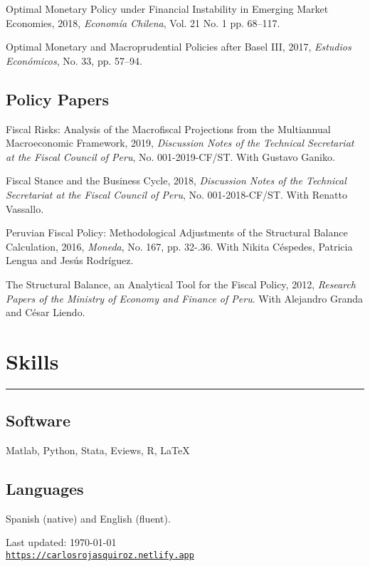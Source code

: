 \documentclass[letterpaper, Biolinum]{article}
\def\footerlink{https://carlosrojasquiroz.netlify.app}
\renewenvironment{itemize}{
  \begin{list}{}{
    \setlength{\leftmargin}{1.5em}
  }
}{
  \end{list}
}
\begin{document}
\begin{itemize}
\item Optimal Monetary Policy under Financial Instability in Emerging Market Economies, 2018, {\it Econom\'ia Chilena}, Vol. 21 No. 1 pp. 68--117.
\item Optimal Monetary and Macroprudential Policies after Basel III, 2017, {\it Estudios Econ\'omicos}, No. 33, pp. 57--94.
\end{itemize}

\subsection*{Policy Papers}

\begin{itemize}
\item Fiscal Risks: Analysis of the Macrofiscal Projections from the Multiannual Macroeconomic Framework, 2019, {\it Discussion Notes of the Technical Secretariat at the Fiscal Council of Peru}, No. 001-2019-CF/ST. With Gustavo Ganiko.
\item Fiscal Stance and the Business Cycle, 2018, {\it Discussion Notes of the Technical Secretariat at the Fiscal Council of Peru}, No. 001-2018-CF/ST. With Renatto Vassallo.
\item Peruvian Fiscal Policy: Methodological Adjustments of the Structural Balance Calculation, 2016, {\it Moneda}, No. 167, pp. 32-.36. With Nikita C\'espedes, Patricia Lengua and Jes\'us Rodr\'iguez. 
\item The Structural Balance, an Analytical Tool for the Fiscal Policy, 2012, {\it Research Papers of the Ministry of Economy and Finance of Peru}. With Alejandro Granda and C\'esar Liendo.
\end{itemize}

\section*{Skills}
\vspace{-0.1in}
\hrule
\vspace{0.1in}
\subsection*{Software}
Matlab, Python, Stata, Eviews, R, \LaTeX\
\subsection*{Languages}
Spanish (native) and English (fluent).

\bigskip

\begin{center}
  \begin{footnotesize}
    Last updated: \today \\
    \href{\footerlink}{\texttt{\footerlink}}
  \end{footnotesize}
\end{center}
\end{document}
